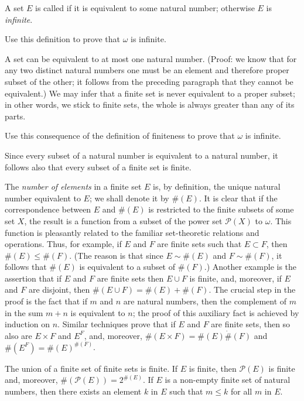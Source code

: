 A set $E$ is called  if it is equivalent to some natural number; otherwise $E$ is \textit{infinite}.
 
\begin{exercise} Use this definition to prove that $\omega$ is infinite.
\end{exercise}

A set can be equivalent to at most one natural number. (Proof: we know that for any two distinct natural numbers one must be an element and therefore proper subset of the other; it follows from the preceding paragraph that they cannot be equivalent.) We may infer that a finite set is never equivalent to a proper subset; in other words, we stick to finite sets, the whole is always greater than any of its parts. 

\begin{exercise}  Use this consequence of the definition of finiteness to prove that $\omega$ is infinite. 
\end{exercise}

Since every subset of a natural number is equivalent to a natural number, it follows also that every subset of a finite set is finite. 

The \textit{number of elements} in a finite set $E$ is, by definition, the unique natural number equivalent to $E$; we shall denote it by $\# (E)$. It is clear that if the correspondence between $E$ and $\# (E)$ is restricted to the finite subsets of some set $X$, the result is a function from a subset of the power set $\mathcal{P}(X)$ to $\omega$. This function is pleasantly related to the familiar set-theoretic relations and operations. Thus, for example, if $E$ and $F$ are finite sets such that $E \subset F$, then $\# (E) \le \# (F)$. (The reason is that since $E \sim \# (E)$ and $F \sim \# (F)$, it follows that $\# (E)$ is equivalent to a subset of $\# (F)$.) Another example is the assertion that if $E$ and $F$ are finite sets then $E \cup F$ is finite, and, moreover, if $E$ and $F$ are disjoint, then $\# (E \cup F) = \# (E) + \# (F)$. The crucial step in the proof is the fact that if $m$ and $n$ are natural numbers, then the complement of $m$ in the sum $m + n$ is equivalent to $n$; the proof of this auxiliary fact is achieved by induction on $n$. Similar techniques prove that if $E$ and $F$ are finite sets, then so also are $E \times F$ and $E^{F}$, and, moreover, $\# (E \times F) = \# (E) \dot \# (F)$ and  $\# (E^{F}) = \# (E)^{\# (F)}$. 

\begin{exercise} The union of a finite set of finite sets is finite. If $E$ is finite, then $\mathcal{P}(E)$ is finite and, moreover, $\# (\mathcal{P}(E)) = 2^{\# (E)}$. If $E$ is a non-empty finite set of natural numbers, then there exists an element $k$ in $E$ such that $m \le k$ for all $m$ in $E$. 
\end{exercise}
